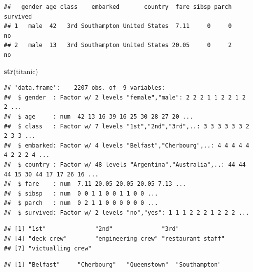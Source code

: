 \documentclass[12pt,]{krantz}
\newenvironment{Shaded}{\begin{snugshade}}{\end{snugshade}}
\newcommand{\KeywordTok}[1]{\textcolor[rgb]{0.13,0.29,0.53}{\textbf{#1}}}
\newcommand{\NormalTok}[1]{#1}
\newcommand{\OperatorTok}[1]{\textcolor[rgb]{0.81,0.36,0.00}{\textbf{#1}}}
\theoremstyle{definition}
\theoremstyle{definition}
\theoremstyle{definition}
\theoremstyle{remark}
\begin{document}
\begin{verbatim}
##   gender age class    embarked       country  fare sibsp parch survived
## 1   male  42   3rd Southampton United States  7.11     0     0       no
## 2   male  13   3rd Southampton United States 20.05     0     2       no
\end{verbatim}

\begin{Shaded}
\begin{Highlighting}[]
\KeywordTok{str}\NormalTok{(titanic)}
\end{Highlighting}
\end{Shaded}

\begin{verbatim}
## 'data.frame':    2207 obs. of  9 variables:
##  $ gender  : Factor w/ 2 levels "female","male": 2 2 2 1 1 2 2 1 2 2 ...
##  $ age     : num  42 13 16 39 16 25 30 28 27 20 ...
##  $ class   : Factor w/ 7 levels "1st","2nd","3rd",..: 3 3 3 3 3 3 2 2 3 3 ...
##  $ embarked: Factor w/ 4 levels "Belfast","Cherbourg",..: 4 4 4 4 4 4 2 2 2 4 ...
##  $ country : Factor w/ 48 levels "Argentina","Australia",..: 44 44 44 15 30 44 17 17 26 16 ...
##  $ fare    : num  7.11 20.05 20.05 20.05 7.13 ...
##  $ sibsp   : num  0 0 1 1 0 0 1 1 0 0 ...
##  $ parch   : num  0 2 1 1 0 0 0 0 0 0 ...
##  $ survived: Factor w/ 2 levels "no","yes": 1 1 1 2 2 2 1 2 2 2 ...
\end{verbatim}

\begin{Shaded}
\end{Shaded}

\begin{verbatim}
## [1] "1st"              "2nd"              "3rd"             
## [4] "deck crew"        "engineering crew" "restaurant staff"
## [7] "victualling crew"
\end{verbatim}

\begin{Shaded}
\end{Shaded}

\begin{verbatim}
## [1] "Belfast"     "Cherbourg"   "Queenstown"  "Southampton"
\end{verbatim}
\end{document}
